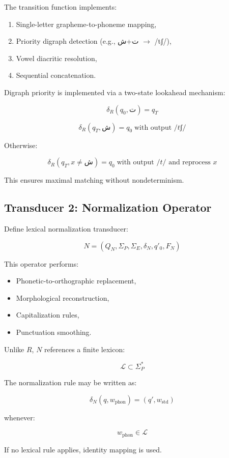 \documentclass[12pt]{article}
\begin{document}
The transition function implements:

\begin{enumerate}
\item Single-letter grapheme-to-phoneme mapping,
\item Priority digraph detection (e.g., ت+ش $\rightarrow$ /tʃ/),
\item Vowel diacritic resolution,
\item Sequential concatenation.
\end{enumerate}

Digraph priority is implemented via a two-state lookahead mechanism:

\[
\delta_R(q_0, ت) = q_{T}
\]

\[
\delta_R(q_{T}, ش) = q_0 \; \text{with output } /tʃ/
\]

Otherwise:

\[
\delta_R(q_{T}, x \neq ش) = q_0 \; \text{with output } /t/ \text{ and reprocess } x
\]

This ensures maximal matching without nondeterminism.

\subsection{Transducer 2: Normalization Operator}

Define lexical normalization transducer:

\[
N = (Q_N, \Sigma_P, \Sigma_E, \delta_N, q'_0, F_N)
\]

This operator performs:

\begin{itemize}
\item Phonetic-to-orthographic replacement,
\item Morphological reconstruction,
\item Capitalization rules,
\item Punctuation smoothing.
\end{itemize}

Unlike $R$, $N$ references a finite lexicon:

\[
\mathcal{L} \subset \Sigma_P^\ast
\]

The normalization rule may be written as:

\[
\delta_N(q, w_{\text{phon}}) = (q', w_{\text{std}})
\]

whenever:

\[
w_{\text{phon}} \in \mathcal{L}
\]

If no lexical rule applies, identity mapping is used.
\end{document}
